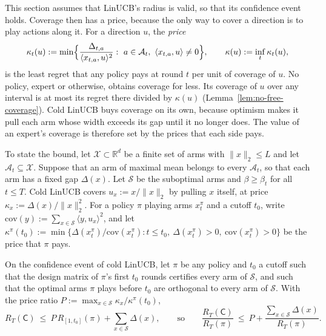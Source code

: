 \documentclass[anon]{alt2027} %
\newif\ifrevmarks\revmarkstrue
\newenvironment{revised}{\ifrevmarks\color{revcolor}\fi}{}
\newcommand{\R}{\mathbb{R}}
\newcommand{\Cold}{\mathsf{C}}
\begin{document}
\begin{revised}
This section assumes that LinUCB's radius is valid, so that its confidence
event holds. Coverage then has a price, because the only way to cover a
direction is to play actions along it. For a direction $u$, the
\emph{price}
\end{revised}
\begin{equation}
\label{eq:price}
\kappa_t(u):=\min\Bigl\{\frac{\Delta_{t,a}}{\langle x_{t,a},u\rangle^2}:\ a\in\mathcal A_t,\ \langle x_{t,a},u\rangle\neq0\Bigr\},
\qquad \kappa(u):=\inf_t\kappa_t(u),
\end{equation}
\begin{revised}
is the least regret that any policy pays at round $t$ per unit of coverage
of $u$. No policy, expert or otherwise, obtains coverage for less. Its
coverage of $u$ over any interval is at most its regret there divided by
$\kappa(u)$ (Lemma~\ref{lem:no-free-coverage}). Cold LinUCB buys coverage on
its own, because optimism makes it pull each arm whose width exceeds its gap
until it no longer does. The value of an expert's coverage is therefore set
by the prices that each side pays.
\end{revised}

\begin{revised}
To state the bound, let $\mathcal X\subset\R^d$ be a finite set of arms with
$\|x\|_2\le L$ and let $\mathcal A_t\subseteq\mathcal X$. Suppose that an
arm of maximal mean belongs to every $\mathcal A_t$, so that each arm has a
fixed gap $\Delta(x)$. Let $\mathcal S$ be the suboptimal arms and
$\beta\ge\beta_t$ for all $t\le T$. Cold LinUCB covers $u_x:=x/\|x\|_2$ by
pulling $x$ itself, at price $\kappa_x:=\Delta(x)/\|x\|_2^2$. For a policy
$\pi$ playing arms $x^\pi_t$ and a cutoff $t_0$, write
$\mathrm{cov}(y):=\sum_{x\in\mathcal S}\langle y,u_x\rangle^2$, and let
$\kappa^\pi(t_0):=\min\{\Delta(x^\pi_t)/\mathrm{cov}(x^\pi_t):t\le t_0,\
\Delta(x^\pi_t)>0,\ \mathrm{cov}(x^\pi_t)>0\}$ be the price that $\pi$ pays.
\end{revised}

\begin{theorem}
\label{thm:general-price}
On the confidence event of cold LinUCB, let $\pi$ be any policy and $t_0$ a
cutoff such that the design matrix of $\pi$'s first $t_0$ rounds certifies
every arm of $\mathcal S$, and such that the optimal arms $\pi$ plays before
$t_0$ are orthogonal to every arm of $\mathcal S$. With the price ratio
$P:=\max_{x\in\mathcal S}\kappa_x/\kappa^\pi(t_0)$,
\[
R_T(\Cold)\ \le\ P\,R_{[1,t_0]}(\pi)+\sum_{x\in\mathcal S}\Delta(x),
\qquad\text{so}\qquad
\frac{R_T(\Cold)}{R_T(\pi)}\ \le\ P+\frac{\sum_{x\in\mathcal S}\Delta(x)}{R_T(\pi)}.
\]
\end{theorem}
\end{document}
